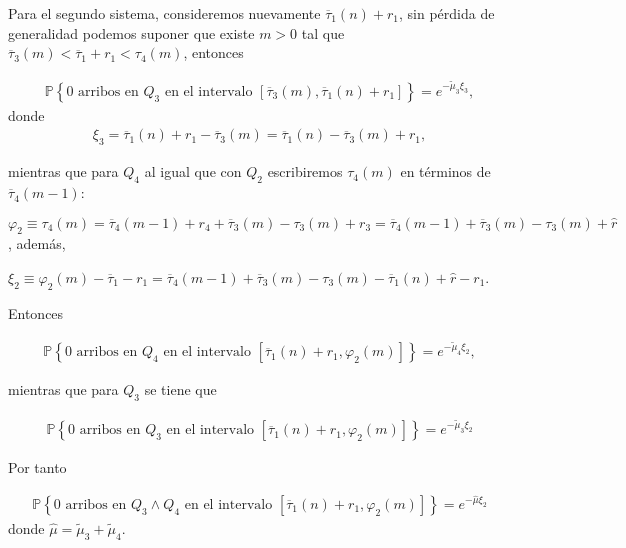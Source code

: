 \documentclass{article}
\newcommand{\prob}{\mathbb{P}}
\begin{document}
Para el segundo sistema, consideremos nuevamente $\overline{\tau}_{1}\left(n\right)+r_{1}$, sin p\'erdida de generalidad podemos suponer que existe $m>0$ tal que $\overline{\tau}_{3}\left(m\right)<\overline{\tau}_{1}+r_{1}<\tau_{4}\left(m\right)$, entonces

\begin{eqnarray}
\prob\left\{0 \textrm{ arribos en }Q_{3}\textrm{ en el intervalo }\left[\overline{\tau}_{3}\left(m\right),\overline{\tau}_{1}\left(n\right)+r_{1}\right]\right\}
=e^{-\tilde{\mu}_{3}\xi_{3}},
\end{eqnarray}
donde 
\begin{eqnarray}
\xi_{3}=\overline{\tau}_{1}\left(n\right)+r_{1}-\overline{\tau}_{3}\left(m\right)=
\overline{\tau}_{1}\left(n\right)-\overline{\tau}_{3}\left(m\right)+r_{1},
\end{eqnarray}

mientras que para $Q_{4}$ al igual que con $Q_{2}$ escribiremos $\tau_{4}\left(m\right)$ en t\'erminos de $\overline{\tau}_{4}\left(m-1\right)$:

$\varphi_{2}\equiv\tau_{4}\left(m\right)=\overline{\tau}_{4}\left(m-1\right)+r_{4}+\overline{\tau}_{3}\left(m\right)
-\tau_{3}\left(m\right)+r_{3}=\overline{\tau}_{4}\left(m-1\right)+\overline{\tau}_{3}\left(m\right)
-\tau_{3}\left(m\right)+\hat{r}$, adem\'as,

$\xi_{2}\equiv\varphi_{2}\left(m\right)-\overline{\tau}_{1}-r_{1}=\overline{\tau}_{4}\left(m-1\right)+\overline{\tau}_{3}\left(m\right)
-\tau_{3}\left(m\right)-\overline{\tau}_{1}\left(n\right)+\hat{r}-r_{1}$. 

Entonces


\begin{eqnarray}
\prob\left\{0 \textrm{ arribos en }Q_{4}\textrm{ en el intervalo }\left[\overline{\tau}_{1}\left(n\right)+r_{1},\varphi_{2}\left(m\right)\right]\right\}
=e^{-\tilde{\mu}_{4}\xi_{2}},
\end{eqnarray}

mientras que para $Q_{3}$ se tiene que 

\begin{eqnarray}
\prob\left\{0 \textrm{ arribos en }Q_{3}\textrm{ en el intervalo }\left[\overline{\tau}_{1}\left(n\right)+r_{1},\varphi_{2}\left(m\right)\right]\right\}
=e^{-\tilde{\mu}_{3}\xi_{2}}
\end{eqnarray}

Por tanto

\begin{eqnarray}
\prob\left\{0 \textrm{ arribos en }Q_{3}\wedge Q_{4}\textrm{ en el intervalo }\left[\overline{\tau}_{1}\left(n\right)+r_{1},\varphi_{2}\left(m\right)\right]\right\}
=e^{-\hat{\mu}\xi_{2}}
\end{eqnarray}
donde $\hat{\mu}=\tilde{\mu}_{3}+\tilde{\mu}_{4}$.
\end{document}

